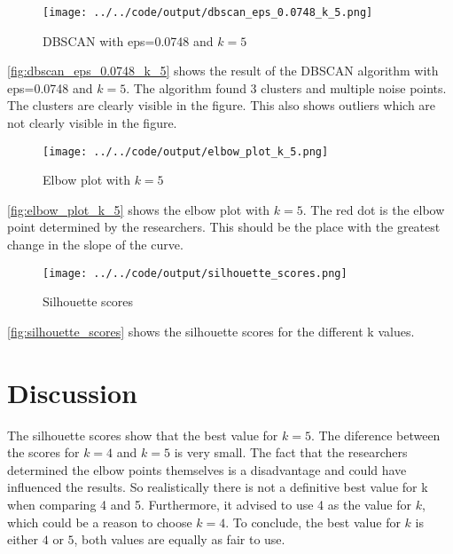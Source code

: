 \documentclass[twoside, a4paper, fleqn, reqno]{article}
\begin{document}
\begin {figure}[H]
	\centering
	\texttt{[image: ../../code/output/dbscan\_eps\_0.0748\_k\_5.png]}
	\caption{DBSCAN with eps=0.0748 and $k=5$}
	\label{fig:dbscan_eps_0.0748_k_5}
\end {figure}

\autoref{fig:dbscan_eps_0.0748_k_5} shows the result of the DBSCAN algorithm with eps=0.0748 and $k=5$.
The algorithm found 3 clusters and multiple noise points.
The clusters are clearly visible in the figure.
This also shows outliers which are not clearly visible in the figure.

\begin {figure}[H]
	\centering
	\texttt{[image: ../../code/output/elbow\_plot\_k\_5.png]}
	\caption{Elbow plot with $k=5$}
	\label{fig:elbow_plot_k_5}
\end {figure}

\autoref{fig:elbow_plot_k_5} shows the elbow plot with $k=5$.
The red dot is the elbow point determined by the researchers.
This should be the place with the greatest change in the slope of the curve.

\begin {figure}[H]
	\centering
	\texttt{[image: ../../code/output/silhouette\_scores.png]}
	\caption{Silhouette scores}
	\label{fig:silhouette_scores}
\end {figure}

\autoref{fig:silhouette_scores} shows the silhouette scores for the different k values.

\section{Discussion}

The silhouette scores show that the best value for $k=5$. The diference between the scores for
$k=4$ and $k=5$ is very small.
The fact that the researchers determined the elbow points themselves is a disadvantage
and could have influenced the results.
So realistically there is not a definitive best value for k when comparing 4 and 5.
Furthermore, it advised to use 4 as the value for $k$, which could be a reason to choose $k=4$.
To conclude, the best value for $k$ is either $4$ or $5$, both values are equally as fair to use. 
\end{document}
